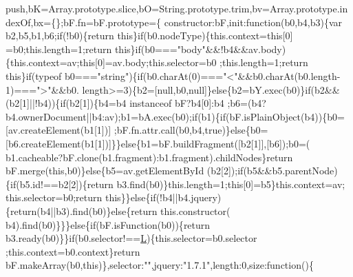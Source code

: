 \begin{DoxyCode}
      push,bK=Array.prototype.slice,bO=String.prototype.trim,bv=Array.prototype.indexOf,bx=\{\};bF.fn=bF.prototype=\{
      constructor:bF,init:\textcolor{keyword}{function}(b0,b4,b3)\{var b2,b5,b1,b6;\textcolor{keywordflow}{if}(!b0)\{\textcolor{keywordflow}{return} \textcolor{keyword}{this}\}\textcolor{keywordflow}{if}(b0.nodeType)\{this.context=\textcolor{keyword}{this}[0]
      =b0;this.length=1;\textcolor{keywordflow}{return} \textcolor{keyword}{this}\}\textcolor{keywordflow}{if}(b0===\textcolor{stringliteral}{"body"}&&!b4&&av.body)\{this.context=av;\textcolor{keyword}{this}[0]=av.body;this.selector=b0
      ;this.length=1;\textcolor{keywordflow}{return} \textcolor{keyword}{this}\}\textcolor{keywordflow}{if}(typeof b0===\textcolor{stringliteral}{"string"})\{\textcolor{keywordflow}{if}(b0.charAt(0)===\textcolor{stringliteral}{"<"}&&b0.charAt(b0.length-1)===\textcolor{stringliteral}{">"}&&b0.
      length>=3)\{b2=[null,b0,null]\}\textcolor{keywordflow}{else}\{b2=bY.exec(b0)\}\textcolor{keywordflow}{if}(b2&&(b2[1]||!b4))\{\textcolor{keywordflow}{if}(b2[1])\{b4=b4 instanceof bF?b4[0]:b4
      ;b6=(b4?b4.ownerDocument||b4:av);b1=bA.exec(b0);\textcolor{keywordflow}{if}(b1)\{\textcolor{keywordflow}{if}(bF.isPlainObject(b4))\{b0=[av.createElement(b1[1])]
      ;bF.fn.attr.call(b0,b4,\textcolor{keyword}{true})\}\textcolor{keywordflow}{else}\{b0=[b6.createElement(b1[1])]\}\}\textcolor{keywordflow}{else}\{b1=bF.buildFragment([b2[1]],[b6]);b0=(
      b1.cacheable?bF.clone(b1.fragment):b1.fragment).childNodes\}\textcolor{keywordflow}{return} bF.merge(\textcolor{keyword}{this},b0)\}\textcolor{keywordflow}{else}\{b5=av.getElementById
      (b2[2]);\textcolor{keywordflow}{if}(b5&&b5.parentNode)\{\textcolor{keywordflow}{if}(b5.id!==b2[2])\{\textcolor{keywordflow}{return} b3.find(b0)\}this.length=1;\textcolor{keyword}{this}[0]=b5\}this.context=av;
      this.selector=b0;\textcolor{keywordflow}{return} \textcolor{keyword}{this}\}\}\textcolor{keywordflow}{else}\{\textcolor{keywordflow}{if}(!b4||b4.jquery)\{\textcolor{keywordflow}{return}(b4||b3).find(b0)\}\textcolor{keywordflow}{else}\{\textcolor{keywordflow}{return} this.constructor(
      b4).find(b0)\}\}\}\textcolor{keywordflow}{else}\{\textcolor{keywordflow}{if}(bF.isFunction(b0))\{\textcolor{keywordflow}{return} b3.ready(b0)\}\}\textcolor{keywordflow}{if}(b0.selector!==\hyperlink{jquery_8js_a38ee4c0b5f4fe2a18d0c783af540d253}{L})\{this.selector=b0.selector
      ;this.context=b0.context\}\textcolor{keywordflow}{return} bF.makeArray(b0,\textcolor{keyword}{this})\},selector:\textcolor{stringliteral}{""},jquery:\textcolor{stringliteral}{"1.7.1"},length:0,size:\textcolor{keyword}{function}()\{\textcolor{keywordflow}{
}
\end{DoxyCode}
